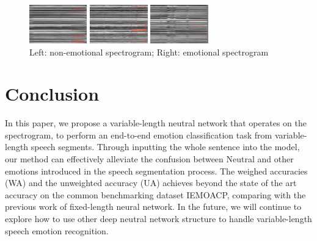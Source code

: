 \documentclass[a4paper]{article}
\begin{document}
\begin{figure}[htb]
    \begin{minipage}[b]{0.25\linewidth}
      \centering
      \centerline{\includegraphics[width=2.5cm]{rnn_out_var_ang}}
    \end{minipage}
    \hfill
    \begin{minipage}[b]{0.25\linewidth}
      \centering
      \centerline{\includegraphics[width=2.5cm]{rnn_out_var_hap}}
    \end{minipage}
    \hfill
    \begin{minipage}[b]{0.25\linewidth}
      \centering
      \centerline{\includegraphics[width=2.5cm]{rnn_out_var_sad}}
    \end{minipage}
    \caption{Left: non-emotional spectrogram; Right: emotional spectrogram}
    \label{fig:rnn_emo}
\end{figure}
    


\section{Conclusion}
\label{sec:conclusion}

In this paper, we propose a variable-length neutral network that operates on the spectrogram, to perform an end-to-end emotion classification task from variable-length speech segments. Through inputting the whole sentence into the model, our method can effectively alleviate the confusion between Neutral and other emotions introduced in the speech segmentation process. The weighed accuracies (WA) and the unweighted accuracy (UA) achieves beyond the state of the art accuracy on the common benchmarking dataset IEMOACP, comparing with the previous work of fixed-length neural network. In the future, we will continue to explore how to use other deep neutral network structure to handle variable-length speech emotion recognition.
\end{document}
